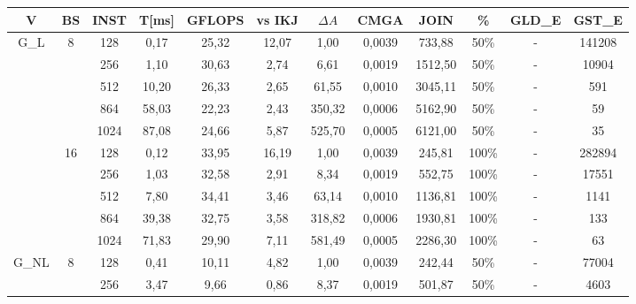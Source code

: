 \documentclass[10pt,a4paper]{article}
\begin{document}
\begin{center}
	\begin{tabular}{ |c|c|c|c|c|c|c|c|c|c|c|c| }
		\hline
		V                       & BS                  & INST & T[ms]  & GFLOPS & vs IKJ & $\Delta A$ & CMGA   & JOIN     & \%    & GLD\_E & GST\_E  \\ \hline
		\multirow{10}{*}{G\_L}  & \multirow{5}{*}{8}  & 128  & 0,17   & 25,32  & 12,07  & 1,00       & 0,0039 & 733,88   & 50\%  & - & 141208  \\ \cline{3-12}
		                        &                     & 256  & 1,10   & 30,63  & 2,74   & 6,61       & 0,0019 & 1512,50  & 50\%  & - & 10904   \\ \cline{3-12}
		                        &                     & 512  & 10,20  & 26,33  & 2,65   & 61,55      & 0,0010 & 3045,11  & 50\%  & - & 591     \\ \cline{3-12}
		                        &                     & 864  & 58,03  & 22,23  & 2,43   & 350,32     & 0,0006 & 5162,90  & 50\%  & - & 59      \\ \cline{3-12}
		                        &                     & 1024 & 87,08  & 24,66  & 5,87   & 525,70     & 0,0005 & 6121,00  & 50\%  & - & 35      \\ \cline{2-12}
		                        & \multirow{5}{*}{16} & 128  & 0,12   & 33,95  & 16,19  & 1,00       & 0,0039 & 245,81   & 100\% & - & 282894  \\ \cline{3-12}
		                        &                     & 256  & 1,03   & 32,58  & 2,91   & 8,34       & 0,0019 & 552,75   & 100\% & - & 17551   \\ \cline{3-12}
		                        &                     & 512  & 7,80   & 34,41  & 3,46   & 63,14      & 0,0010 & 1136,81  & 100\% & - & 1141    \\ \cline{3-12}
		                        &                     & 864  & 39,38  & 32,75  & 3,58   & 318,82     & 0,0006 & 1930,81  & 100\% & - & 133     \\ \cline{3-12}
		                        &                     & 1024 & 71,83  & 29,90  & 7,11   & 581,49     & 0,0005 & 2286,30  & 100\% & - & 63      \\ \cline{1-12}
		\multirow{10}{*}{G\_NL} & \multirow{5}{*}{8}  & 128  & 0,41   & 10,11  & 4,82   & 1,00       & 0,0039 & 242,44   & 50\%  & - & 77004   \\ \cline{3-12}
		                        &                     & 256  & 3,47   & 9,66   & 0,86   & 8,37       & 0,0019 & 501,87   & 50\%  & - & 4603    \\ \cline{3-12}

\end{tabular}
\end{center}
\end{document}
